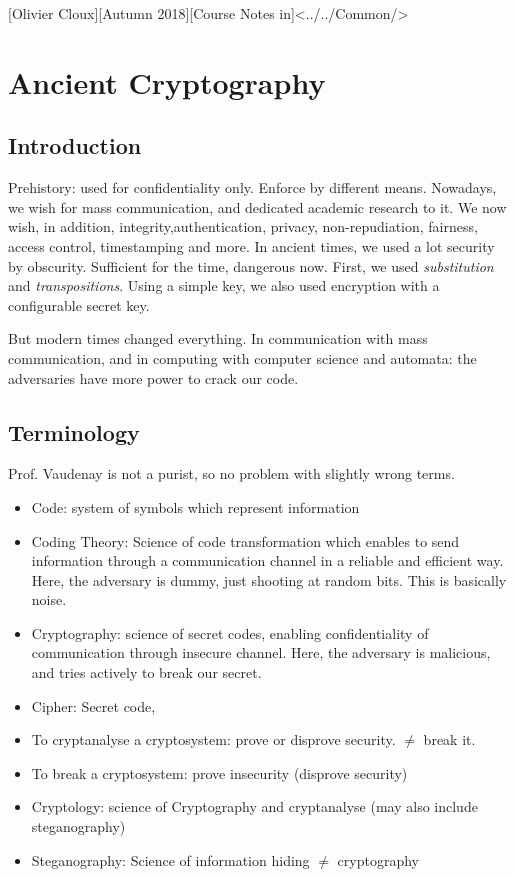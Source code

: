 \documentclass[11pt,a4paper]{article}
\begin{document}
[Olivier Cloux][Autumn 2018][Course Notes in]<../../Common/>
\tableofcontents
\newpage
\section{Ancient Cryptography}
\subsection{Introduction}

Prehistory: used for confidentiality only. Enforce by different means. Nowadays, we wish for mass communication, and dedicated academic research to it. We now wish, in addition, integrity,authentication, privacy, non-repudiation, fairness, access control, timestamping and more. In ancient times, we used a lot security by obscurity. Sufficient for the time, dangerous now. First, we used \textit{substitution} and \textit{transpositions}. Using a simple key, we also used encryption with a configurable secret key.

But modern times changed everything. In communication with mass communication, and in computing with computer science and automata: the adversaries have more power to crack our code.

\subsection{Terminology}
Prof. Vaudenay is not a purist, so no problem with slightly wrong terms.
\begin{itemize}
    \item Code: system of symbols which represent information
    \item Coding Theory: Science of code transformation which enables to send information through a communication channel in a reliable and efficient way. Here, the adversary is dummy, just shooting at random bits. This is basically noise.
    \item Cryptography: science of secret codes, enabling confidentiality of communication through insecure channel. Here, the adversary is malicious, and tries actively to break our secret.
    \item Cipher: Secret code,
    \item To cryptanalyse a cryptosystem: prove or disprove security. $\neq$ break it.
    \item To break a cryptosystem: prove insecurity (disprove security)
    \item Cryptology: science of Cryptography and cryptanalyse (may also include steganography)
    \item Steganography: Science of information hiding $\neq$ cryptography
\end{itemize}
\end{document}
